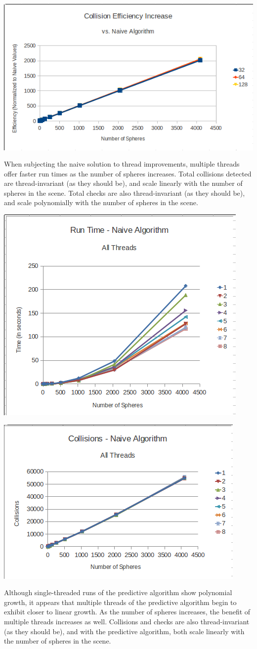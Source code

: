 \documentclass[conference]{IEEEtran}
\begin{document}
\begin{center}
	\includegraphics[width=.45\textwidth]{collision_efficiency.png}
\end{center}

When subjecting the naive solution to thread improvements, multiple threads offer faster run times as the number of spheres increases.  Total collisions detected are thread-invariant (as they should be), and scale linearly with the number of spheres in the scene.  Total checks are also thread-invariant (as they should be), and scale polynomially with the number of spheres in the scene.

\begin{center}
	\includegraphics[width=.45\textwidth]{runtime_naive_allthreads.png}
\end{center}

\begin{center}
	\includegraphics[width=.45\textwidth]{collisions_naive_allthreads.png}
\end{center}

Although single-threaded runs of the predictive algorithm show polynomial growth, it appears that multiple threads of the predictive algorithm begin to exhibit closer to linear growth.  As the number of spheres increases, the benefit of multiple threads increases as well.  Collisions and checks are also thread-invariant (as they should be), and with the predictive algorithm, both scale linearly with the number of spheres in the scene.
\end{document}

